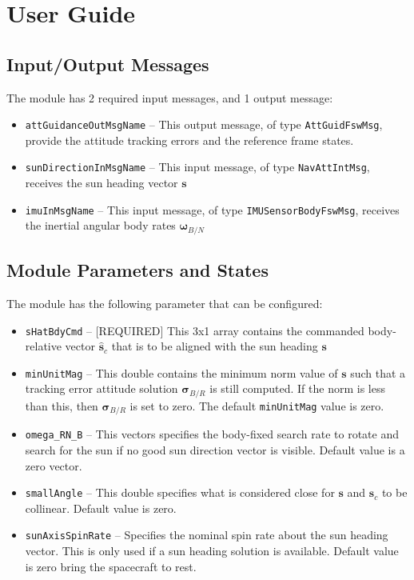
\section{User Guide}
\subsection{Input/Output Messages}
The module has 2 required input messages, and 1 output message:
\begin{itemize}
	\item {\tt attGuidanceOutMsgName} -- This output message, of type {\tt AttGuidFswMsg}, provide the attitude tracking errors and the reference frame states.
	\item {\tt sunDirectionInMsgName} -- This input message, of type {\tt NavAttIntMsg}, receives the sun heading vector $\bm s$
	\item {\tt imuInMsgName} -- This input message, of type {\tt IMUSensorBodyFswMsg}, receives the inertial angular body rates $\bm \omega_{B/N}$
\end{itemize}

\subsection{Module Parameters and States}
The module has the following parameter that can be configured:
\begin{itemize}
	\item {\tt sHatBdyCmd} -- [REQUIRED] This 3x1 array contains the commanded body-relative vector $\hat{\bm s}_{c}$ that is to be aligned with the sun heading $\bm s$
	
	\item {\tt minUnitMag} -- This double contains the minimum norm value of $\bm s$ such that a tracking error attitude solution $\bm\sigma_{B/R}$ is still computed.  If the norm is less than this, then $\bm\sigma_{B/R}$ is set to zero.    The default {\tt minUnitMag} value is zero. 
	
	\item {\tt omega\_RN\_B} -- This vectors specifies the body-fixed search rate to rotate and search for the sun if no good sun direction vector is visible.  Default value is a zero vector.  

	\item {\tt smallAngle} -- This double specifies what is considered close for $\bm s$ and $\hat{\bm s}_{c}$ to be collinear.  Default value is zero.  
	
	\item {\tt sunAxisSpinRate} -- Specifies the nominal spin rate about the sun heading vector.  This is only used if a sun heading solution is available.  Default value is zero bring the spacecraft to rest. 
	
\end{itemize}

